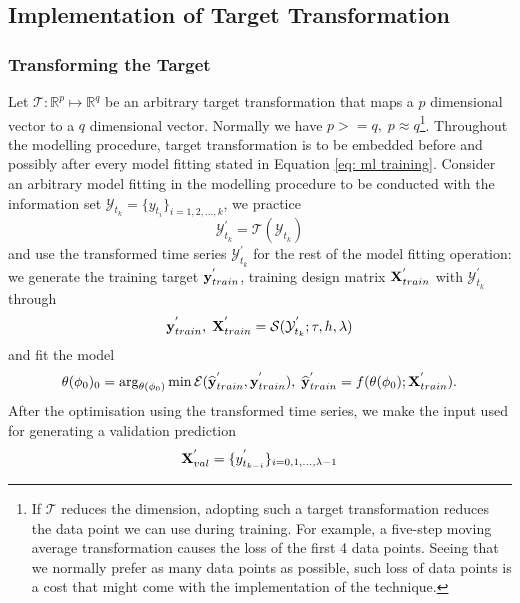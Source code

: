 \subsection{Implementation of Target Transformation}\label{subsec: target transformation procedure}

\subsubsection{Transforming the Target}
Let $\mathcal{T}: \mathbb{R}^p \longmapsto \mathbb{R}^q$ be an arbitrary target transformation that maps a $p$ dimensional vector to a $q$ dimensional vector. Normally we have $p >= q, \; p \approx q$\footnote{If $\mathcal{T}$ reduces the dimension, adopting such a target transformation reduces the data point we can use during training. For example, a five-step moving average transformation causes the loss of the first 4 data points. Seeing that we normally prefer as many data points as possible, such loss of data points is a cost that might come with the implementation of the technique.}. Throughout the modelling procedure, target transformation is to be embedded before and possibly after every model fitting stated in Equation \ref{eq: ml training}. Consider an arbitrary model fitting in the modelling procedure to be conducted with the information set $\mathcal{Y}_{t_k} = \{ y_{t_i} \}_{i = 1, 2, \ldots, k}$, we practice
\begin{equation*}
    \mathcal{Y}^{'}_{t_k} = \mathcal{T}(\mathcal{Y}_{t_k})
\end{equation*}
and use the transformed time series $\mathcal{Y}^{'}_{t_k}$ for the rest of the model fitting operation: we generate the training target $\mathbf{y}^{'}_{train}$, training design matrix $\mathbf{X}^{'}_{train}$ with $\mathcal{Y}^{'}_{t_k}$ through
\begin{equation*}
    \mathbf{y}^{'}_{train}, \; \mathbf{X}^{'}_{train} = \mathcal{S}(\mathcal{Y}^{'}_{t_k}; \tau, h, \lambda)
\end{equation*}
and fit the model
\begin{equation*}
    \theta(\phi_0)_0 = \arg_{\theta(\phi_0)} \min \mathcal{E}(\widehat{\mathbf{y}}^{'}_{train}, \mathbf{y}^{'}_{train}), \; \widehat{\mathbf{y}}^{'}_{train} = f(\theta(\phi_0); \mathbf{X}^{'}_{train}).
\end{equation*}
After the optimisation using the transformed time series, we make the input used for generating a validation prediction
\begin{equation*}
    \mathbf{X}^{'}_{val} = \{y^{'}_{t_{k-i}} \}_{i = 0, 1, \ldots, \lambda-1}
\end{equation*}
